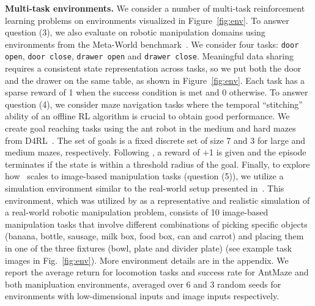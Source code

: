 \textbf{Multi-task environments.} We consider a number of multi-task reinforcement learning problems on environments visualized in Figure~\ref{fig:env}. 
To answer question (3), we also evaluate on robotic manipulation domains using environments from the Meta-World benchmark~\citep{yu2020metaworld}. We consider four tasks: \texttt{door open}, \texttt{door close}, \texttt{drawer open} and \texttt{drawer close}. Meaningful data sharing requires a consistent state representation across tasks, so we put both the door and the drawer on the same table, as shown in Figure~\ref{fig:env}. Each task has a sparse reward of 1 when the success condition is met and 0 otherwise. To answer question (4), we consider maze navigation tasks where the temporal ``stitching'' ability of an offline RL algorithm is crucial to obtain good performance. We create goal reaching tasks using the ant robot in the medium and hard mazes from D4RL~\citep{fu2020d4rl}. The set of goals is a fixed discrete set of size 7 and 3 for large and medium mazes, respectively. Following \citet{fu2020d4rl}, a reward of +1 is given and the episode terminates if the state is within a threshold radius of the goal. Finally, to explore how \cdsmethodname\ scales to image-based manipulation tasks (question (5)), we utilize a simulation environment similar to the real-world setup presented in~\citep{kalashnikov2021mt}. This environment, which was utilized by \citet{kalashnikov2021mt} as a representative and realistic simulation of a real-world robotic manipulation problem, consists of 10 image-based manipulation tasks that involve different combinations of picking specific objects (banana, bottle, sausage, milk box, food box, can and carrot) and placing them in one of the three fixtures (bowl, plate and divider plate) (see example task images in Fig.~\ref{fig:env}).
More environment details are in the appendix. We report the average return for locomotion tasks and success rate for AntMaze and both manipluation environments, averaged over 6 and 3 random seeds for environments with low-dimensional inputs and image inputs respectively.

